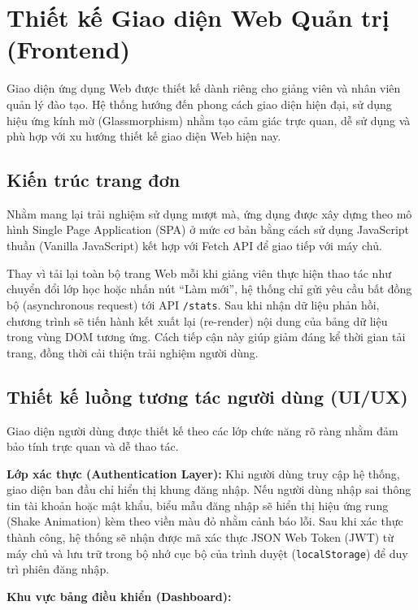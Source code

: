 \documentclass[12pt,a4paper]{report}
\begin{document}
\section{Thiết kế Giao diện Web Quản trị (Frontend)} 

Giao diện ứng dụng Web được thiết kế dành riêng cho giảng viên và nhân viên quản lý đào tạo. Hệ thống hướng đến phong cách giao diện hiện đại, sử dụng hiệu ứng kính mờ (Glassmorphism) nhằm tạo cảm giác trực quan, dễ sử dụng và phù hợp với xu hướng thiết kế giao diện Web hiện nay.

\subsection{Kiến trúc trang đơn} 

Nhằm mang lại trải nghiệm sử dụng mượt mà, ứng dụng được xây dựng theo mô hình Single Page Application (SPA) ở mức cơ bản bằng cách sử dụng JavaScript thuần (Vanilla JavaScript) kết hợp với Fetch API để giao tiếp với máy chủ.

Thay vì tải lại toàn bộ trang Web mỗi khi giảng viên thực hiện thao tác như chuyển đổi lớp học hoặc nhấn nút ``Làm mới'', hệ thống chỉ gửi yêu cầu bất đồng bộ (asynchronous request) tới API \texttt{/stats}. Sau khi nhận dữ liệu phản hồi, chương trình sẽ tiến hành kết xuất lại (re-render) nội dung của bảng dữ liệu trong vùng DOM tương ứng. Cách tiếp cận này giúp giảm đáng kể thời gian tải trang, đồng thời cải thiện trải nghiệm người dùng.

\subsection{Thiết kế luồng tương tác người dùng (UI/UX)} 

Giao diện người dùng được thiết kế theo các lớp chức năng rõ ràng nhằm đảm bảo tính trực quan và dễ thao tác.

\textbf{Lớp xác thực (Authentication Layer):}  
Khi người dùng truy cập hệ thống, giao diện ban đầu chỉ hiển thị khung đăng nhập. Nếu người dùng nhập sai thông tin tài khoản hoặc mật khẩu, biểu mẫu đăng nhập sẽ hiển thị hiệu ứng rung (Shake Animation) kèm theo viền màu đỏ nhằm cảnh báo lỗi. Sau khi xác thực thành công, hệ thống sẽ nhận được mã xác thực JSON Web Token (JWT) từ máy chủ và lưu trữ trong bộ nhớ cục bộ của trình duyệt (\texttt{localStorage}) để duy trì phiên đăng nhập.

\textbf{Khu vực bảng điều khiển (Dashboard):}
\end{document}
